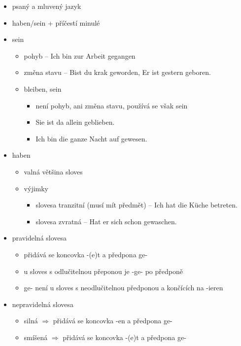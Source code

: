 \documentclass[a4paper,12pt]{report}
\begin{document}
\begin{itemize}
  \item psaný a mluvený jazyk
  \item haben/sein + příčestí minulé
  \item sein
    \begin{itemize}
      \item pohyb -- Ich bin zur Arbeit gegangen
      \item změna stavu -- Bist du krak geworden, Er ist gestern geboren.
      \item bleiben, sein
        \begin{itemize}
          \item není pohyb, ani změna stavu, používá se však sein
          \item Sie ist da allein geblieben.
          \item Ich bin die ganze Nacht auf gewesen.
        \end{itemize}
    \end{itemize}
  \item haben
    \begin{itemize}
      \item valná většina sloves
      \item výjimky
        \begin{itemize}
          \item slovesa tranzitní (musí mít předmět) -- Ich hat die Küche betreten.
          \item slovesa zvratná -- Hat er sich schon gewaschen.
        \end{itemize}
    \end{itemize}
  \item pravidelná slovesa
    \begin{itemize}
      \item přidává se koncovka -(e)t a předpona ge-
      \item u sloves s odlučitelnou přeponou je -ge- po předponě
      \item ge- není u sloves s neodlučitelnou předponou a končících na -ieren
    \end{itemize}
  \item nepravidelná slovesa
    \begin{itemize}
      \item silná $\Rightarrow$ přidává se koncovka -en a předpona ge-
      \item smíšená $\Rightarrow$ přidává se koncovka -(e)t a předpona ge-
    \end{itemize}
\end{itemize}
\end{document}
